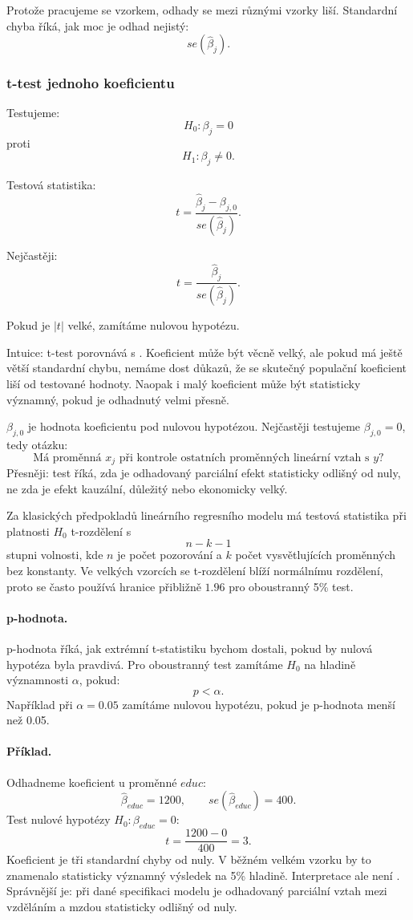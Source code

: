 Protože pracujeme se vzorkem, odhady se mezi různými vzorky liší. Standardní chyba říká, jak moc je odhad
nejistý:
\[
se(\hat\beta_j).
\]

\subsubsection{t-test jednoho koeficientu}

Testujeme:
\[
H_0:\beta_j=0
\]
proti
\[
H_1:\beta_j\neq 0.
\]

Testová statistika:
\[
t=
\frac{\hat\beta_j-\beta_{j,0}}{se(\hat\beta_j)}.
\]

Nejčastěji:
\[
t=
\frac{\hat\beta_j}{se(\hat\beta_j)}.
\]

Pokud je $|t|$ velké, zamítáme nulovou hypotézu.

Intuice: t-test porovnává  s . Koeficient může být věcně
velký, ale pokud má ještě větší standardní chybu, nemáme dost důkazů, že se skutečný populační koeficient
liší od testované hodnoty. Naopak i malý koeficient může být statisticky významný, pokud je odhadnutý
velmi přesně.

\(\beta_{j,0}\) je hodnota koeficientu pod nulovou hypotézou. Nejčastěji testujeme \(\beta_{j,0}=0\),
tedy otázku:
\[
\text{Má proměnná } x_j \text{ při kontrole ostatních proměnných lineární vztah s } y?
\]
Přesněji: test říká, zda je odhadovaný parciální efekt statisticky odlišný od nuly, ne zda je efekt
kauzální, důležitý nebo ekonomicky velký.

Za klasických předpokladů lineárního regresního modelu má testová statistika při platnosti \(H_0\)
t-rozdělení s
\[
n-k-1
\]
stupni volnosti, kde \(n\) je počet pozorování a \(k\) počet vysvětlujících proměnných bez konstanty.
Ve velkých vzorcích se t-rozdělení blíží normálnímu rozdělení, proto se často používá hranice přibližně
\(1.96\) pro oboustranný 5\% test.

\paragraph{p-hodnota.}
p-hodnota říká, jak extrémní t-statistiku bychom dostali, pokud by nulová hypotéza byla pravdivá. Pro
oboustranný test zamítáme \(H_0\) na hladině významnosti \(\alpha\), pokud:
\[
p < \alpha.
\]
Například při \(\alpha=0.05\) zamítáme nulovou hypotézu, pokud je p-hodnota menší než 0.05.

\paragraph{Příklad.}
Odhadneme koeficient u proměnné \(educ\):
\[
\hat\beta_{educ}=1200,
\qquad
se(\hat\beta_{educ})=400.
\]
Test nulové hypotézy \(H_0:\beta_{educ}=0\):
\[
t=\frac{1200-0}{400}=3.
\]
Koeficient je tři standardní chyby od nuly. V běžném velkém vzorku by to znamenalo statisticky významný
výsledek na 5\% hladině. Interpretace ale není .
Správnější je: při dané specifikaci modelu je odhadovaný parciální vztah mezi vzděláním a mzdou
statisticky odlišný od nuly.

